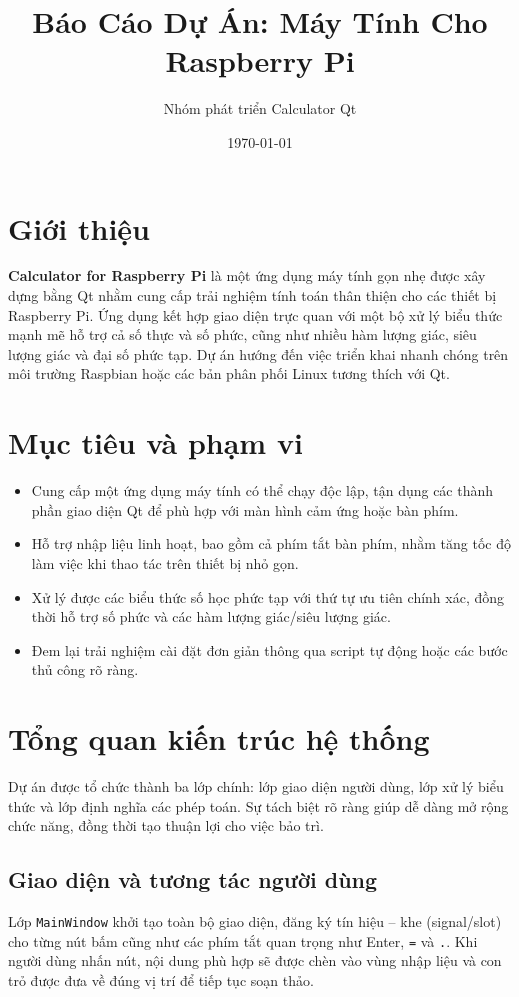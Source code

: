 \documentclass[12pt,a4paper]{article}
\title{Báo Cáo Dự Án: Máy Tính Cho Raspberry Pi}
\author{Nhóm phát triển Calculator Qt}
\date{\today}
\begin{document}
\maketitle
\tableofcontents
\newpage

\section{Giới thiệu}
\textbf{Calculator for Raspberry Pi} là một ứng dụng máy tính gọn nhẹ được xây dựng bằng Qt nhằm cung cấp trải nghiệm tính toán thân thiện cho các thiết bị Raspberry Pi. Ứng dụng kết hợp giao diện trực quan với một bộ xử lý biểu thức mạnh mẽ hỗ trợ cả số thực và số phức, cũng như nhiều hàm lượng giác, siêu lượng giác và đại số phức tạp. Dự án hướng đến việc triển khai nhanh chóng trên môi trường Raspbian hoặc các bản phân phối Linux tương thích với Qt.

\section{Mục tiêu và phạm vi}
\begin{itemize}[noitemsep]
    \item Cung cấp một ứng dụng máy tính có thể chạy độc lập, tận dụng các thành phần giao diện Qt để phù hợp với màn hình cảm ứng hoặc bàn phím.
    \item Hỗ trợ nhập liệu linh hoạt, bao gồm cả phím tắt bàn phím, nhằm tăng tốc độ làm việc khi thao tác trên thiết bị nhỏ gọn.\cite{mainwindow}
    \item Xử lý được các biểu thức số học phức tạp với thứ tự ưu tiên chính xác, đồng thời hỗ trợ số phức và các hàm lượng giác/siêu lượng giác.\cite{parser}
    \item Đem lại trải nghiệm cài đặt đơn giản thông qua script tự động hoặc các bước thủ công rõ ràng.\cite{readme}
\end{itemize}

\section{Tổng quan kiến trúc hệ thống}
Dự án được tổ chức thành ba lớp chính: lớp giao diện người dùng, lớp xử lý biểu thức và lớp định nghĩa các phép toán. Sự tách biệt rõ ràng giúp dễ dàng mở rộng chức năng, đồng thời tạo thuận lợi cho việc bảo trì.

\subsection{Giao diện và tương tác người dùng}
Lớp \texttt{MainWindow} khởi tạo toàn bộ giao diện, đăng ký tín hiệu -- khe (signal/slot) cho từng nút bấm cũng như các phím tắt quan trọng như Enter, \texttt{=} và \texttt{.}.\cite{mainwindow} Khi người dùng nhấn nút, nội dung phù hợp sẽ được chèn vào vùng nhập liệu và con trỏ được đưa về đúng vị trí để tiếp tục soạn thảo.
\end{document}
